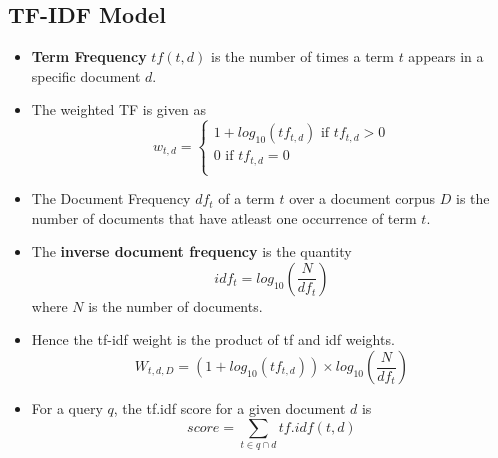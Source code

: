 \documentclass{article}
\begin{document}
\subsection{TF-IDF Model}
\begin{itemize}
    \item \textbf{Term Frequency} $tf(t, d)$ is the number of times a term $t$ appears in a specific document $d$. 
    
    \item The weighted TF is given as 
    \begin{equation}
        w_{t, d} = \begin{cases}
            1 + log_{10}(tf_{t,d})\text{ if }tf_{t,d} > 0 \\
            0 \text{ if }tf_{t,d} = 0 \\
        \end{cases}
    \end{equation}
    
    \item The Document Frequency $df_t$ of a term $t$ over a document corpus $D$ is the number of documents that have atleast one occurrence of term $t$. 
    
    \item The \textbf{inverse document frequency} is the quantity 
    \begin{equation}
        idf_t = log_{10}\left(\frac{N}{df_t}\right)
    \end{equation}
    where $N$ is the number of documents.
    
    \item Hence the tf-idf weight is the product of tf and idf weights. 
    \begin{equation}
        W_{t, d, D} = (1 + log_{10}(tf_{t,d})) \times log_{10}\left(\frac{N}{df_t}\right)
    \end{equation}
    
    \item For a query $q$, the tf.idf score for a given document $d$ is 
    \begin{equation}
        score = \sum_{t \in q \cap d} tf.idf(t, d)
    \end{equation}
\end{itemize}
\end{document}
